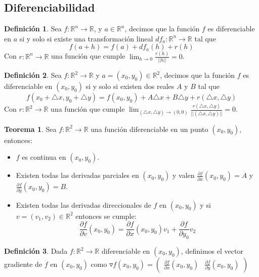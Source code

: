 \documentclass[10pt]{article}
\theoremstyle{definition}
\newtheorem{definition}{Definición}[section]
\newtheorem{theorem}{Teorema}[section]
\begin{document}
\newpage\subsection{Diferenciabilidad}
\begin{definition}
    Sea $f:\mathbb{R}^n\to\mathbb{R}$, y $a\in\mathbb{R}^n$, decimos que la función $f$ es diferenciable en $a$ si y solo si existe una transformación lineal $df_a:\mathbb{R}^n\to\mathbb{R}$ tal que $$f(a+h)=f(a)+df_a(h)+r(h)$$
    Con $r:\mathbb{R}^n\to\mathbb{R}$ una función que cumple $\lim_{h \to 0} \frac{r(h)}{||h||}=0$.
\end{definition}
\begin{definition}
    Sea $f:\mathbb{R}^2\to\mathbb{R}$ y $a=(x_0,y_0)\in\mathbb{R}^2$, decimos que la función $f$ es diferenciable en $(x_0,y_0)$ si y solo si existen dos reales $A$ y $B$ tal que $$f(x_0+\triangle x,y_0+\triangle y)=f(x_0,y_0)+A\triangle x+B\triangle y+r(\triangle x,\triangle y)$$
    Con $r:\mathbb{R}^2\to\mathbb{R}$ una función que cumple $\lim_{(\triangle x,\triangle y) \to (0,0)}\frac{r(\triangle x,\triangle y)}{||(\triangle x,\triangle y)||}=0$.
\end{definition}
\begin{theorem}
    Sea $f:\mathbb{R}^2\to\mathbb{R}$ una función diferenciable en un punto $(x_0,y_0)$, entonces:
    \begin{itemize}
        \item $f$ es continua en $(x_0,y_0)$.
        \item Existen todas las derivadas parciales en $(x_0,y_0)$ y valen $\frac{\partial f}{\partial x}(x_0,y_0)=A$ y $\frac{\partial f}{\partial y}(x_0,y_0)=B$.
        \item Existen todas las derivadas direccionales de $f$ en $(x_0,y_0)$ y si $v=(v_1,v_2)\in\mathbb{R}^2$ entonces se cumple:$$\frac{\partial f}{\partial v}(x_0,y_0)=\frac{\partial f}{\partial x}(x_0,y_0)v_1+\frac{\partial f}{\partial y_0}v_2$$
    \end{itemize}
\end{theorem}
\begin{definition}
    Dada $f:\mathbb{R}^2\to\mathbb{R}$ diferenciable en $(x_0,y_0)$, definimos el vector gradiente de $f$ en $(x_0,y_0)$ como $\triangledown f( x_{0} ,y_{0}) =\begin{pmatrix}
\frac{\partial f}{\partial x}( x_{0} ,y_{0}) & \frac{\partial f}{\partial y}( x_{0} ,y_{0})
\end{pmatrix}$
\end{definition}
\end{document}
